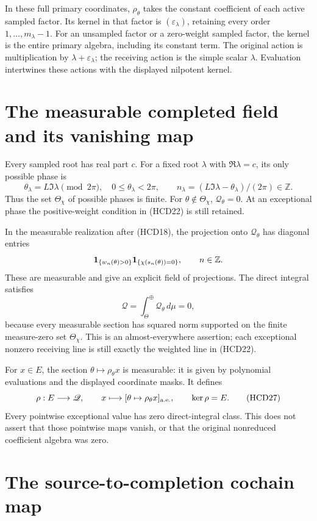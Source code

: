 \documentclass[11pt]{article}
\begin{document}
In these full primary coordinates, $\rho_\theta$ takes
the constant coefficient of each active sampled factor.
Its kernel in that factor is $(\varepsilon_\lambda)$,
retaining every order $1,\ldots,m_\lambda-1$.
For an unsampled factor or a zero-weight sampled factor,
the kernel is the entire primary algebra, including
its constant term. The original action is multiplication
by $\lambda+\varepsilon_\lambda$; the receiving action
is the simple scalar $\lambda$. Evaluation intertwines
these actions with the displayed nilpotent kernel.

\section{The measurable completed field and its vanishing map}

Every sampled root has real part $c$. For a fixed root $\lambda$
with $\Re\lambda=c$, its only possible phase is
\[
 \theta_\lambda=L\Im\lambda\pmod{2\pi},\quad
 0\le\theta_\lambda<2\pi,\qquad
 n_\lambda=(L\Im\lambda-\theta_\lambda)/(2\pi)\in\mathbb Z.
\]
Thus the set $\Theta_\chi$ of possible phases is finite.
For $\theta\notin\Theta_\chi$, $\mathcal Q_\theta=0$.
At an exceptional phase the positive-weight condition
in (HCD22) is still retained.

In the measurable realization after (HCD18), the projection
onto $\mathcal Q_\theta$ has diagonal entries
\[
 {\bf1}_{\{w_n(\theta)>0\}}
 {\bf1}_{\{\chi(s_n(\theta))=0\}},\qquad n\in\mathbb Z.
\]
These are measurable and give an explicit field of projections.
The direct integral satisfies
\[
 \mathscr Q=\int_\Theta^\oplus\mathcal Q_\theta\,d\mu=0,
 \tag{HCD26}
\]
because every measurable section has squared norm supported
on the finite measure-zero set $\Theta_\chi$.
This is an almost-everywhere assertion; each exceptional
nonzero receiving line is still exactly the weighted line
in (HCD22).

For $x\in E$, the section $\theta\mapsto\rho_\theta x$
is measurable: it is given by polynomial evaluations and
the displayed coordinate masks. It defines
\[
 \rho:E\longrightarrow\mathscr Q,\qquad
 x\longmapsto[\theta\mapsto\rho_\theta x]_{\rm a.e.},
 \qquad \ker\rho=E.
 \tag{HCD27}
\]
Every pointwise exceptional value has zero direct-integral
class. This does not assert that those pointwise maps vanish,
or that the original nonreduced coefficient algebra was zero.

\section{The source-to-completion cochain map}
\end{document}
